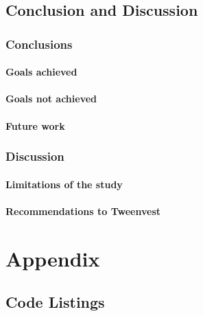 \documentclass[11pt,english,a4paper,hidelinks]{book}
\begin{document}
\chapter{Conclusion and Discussion}

\section{Conclusions}

\subsection{Goals achieved}

\subsection{Goals not achieved}

\subsection{Future work}


\section{Discussion}
\subsection{Limitations of the study}

\subsection{Recommendations to Tweenvest}



\printbibliography[heading=bibintoc, title=Bibliography]
\label{sec:biblio}
\newpage

\part{Appendix}

\chapter{Code Listings}
\end{document}
